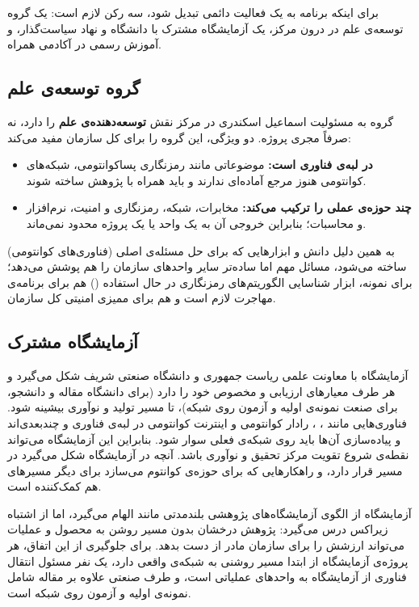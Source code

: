 \documentclass[a4paper,12pt]{article}
\begin{document}
	برای اینکه برنامه به یک فعالیت دائمی تبدیل شود، سه رکن لازم است: یک گروه توسعه‌ی علم در درون مرکز،
	یک آزمایشگاه مشترک با دانشگاه و نهاد سیاست‌گذار، و آموزش رسمی در آکادمی همراه.

	\subsection{گروه توسعه‌ی علم}
	گروه به مسئولیت اسماعیل اسکندری در مرکز نقش \textbf{توسعه‌دهنده‌ی علم} را دارد، نه صرفاً مجری پروژه.
	دو ویژگی، این گروه را برای کل سازمان مفید می‌کند:
	\begin{itemize}[rightmargin=0.5cm, itemsep=4pt]
		\item \textbf{در لبه‌ی فناوری است:} موضوعاتی مانند رمزنگاری پساکوانتومی، شبکه‌های کوانتومی هنوز مرجع آماده‌ای ندارند و باید همراه با پژوهش ساخته شوند.
		\item \textbf{چند حوزه‌ی عملی را ترکیب می‌کند:} مخابرات، شبکه، رمزنگاری و امنیت، نرم‌افزار و محاسبات؛ بنابراین خروجی آن به یک واحد یا یک پروژه محدود نمی‌ماند.
	\end{itemize}
	به همین دلیل دانش و ابزارهایی که برای حل مسئله‌ی اصلی (فناوری‌های کوانتومی) ساخته می‌شود، مسائل مهم اما ساده‌تر سایر واحدهای سازمان را هم پوشش می‌دهد؛
	برای نمونه، ابزار شناسایی الگوریتم‌های رمزنگاری در حال استفاده () هم برای برنامه‌ی مهاجرت  لازم است و هم برای ممیزی امنیتی کل سازمان.

	\subsection{آزمایشگاه مشترک}
	آزمایشگاه با معاونت علمی ریاست جمهوری و دانشگاه صنعتی شریف شکل می‌گیرد و هر طرف معیارهای ارزیابی و  مخصوص خود را دارد
	(برای دانشگاه مقاله و دانشجو، برای صنعت نمونه‌ی اولیه و آزمون روی شبکه)، تا مسیر تولید و نوآوری بیشینه شود.
	فناوری‌هایی مانند ، ، رادار کوانتومی و اینترنت کوانتومی در لبه‌ی فناوری و چندبعدی‌اند و پیاده‌سازی آن‌ها باید روی شبکه‌ی فعلی سوار شود.
	بنابراین این آزمایشگاه می‌تواند نقطه‌ی شروع تقویت مرکز تحقیق و نوآوری باشد.
	آنچه در آزمایشگاه شکل می‌گیرد در مسیر  قرار دارد، و راهکارهایی که برای حوزه‌ی کوانتوم می‌سازد برای دیگر مسیرهای  هم کمک‌کننده است.

	آزمایشگاه از الگوی آزمایشگاه‌های پژوهشی بلندمدتی مانند  الهام می‌گیرد، اما از اشتباه زیراکس درس می‌گیرد:
	پژوهش درخشان بدون مسیر روشن به محصول و عملیات می‌تواند ارزشش را برای سازمان مادر از دست بدهد.
	برای جلوگیری از این اتفاق، هر پروژه‌ی آزمایشگاه از ابتدا مسیر روشنی به شبکه‌ی واقعی دارد، یک نفر مسئول انتقال فناوری از آزمایشگاه به واحدهای عملیاتی است،
	و  طرف صنعتی علاوه بر مقاله شامل نمونه‌ی اولیه و آزمون روی شبکه است.
\end{document}

